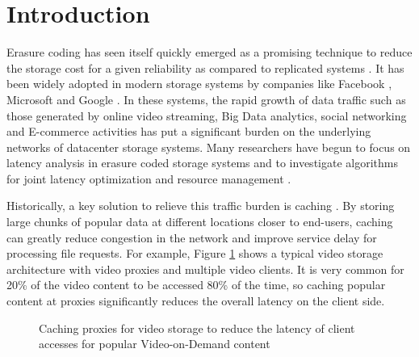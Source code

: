 \section{Introduction}

Erasure coding has seen itself quickly emerged as a promising technique to reduce the storage cost for a given reliability as compared to replicated systems \cite{2015_1,Dimakis:10}. It has been widely adopted in modern storage systems by companies like Facebook \cite{Sathiamoorthy13}, Microsoft \cite{Asure14} and Google \cite{Fikes10}. In these systems, the rapid growth of data traffic such as those generated by online video streaming, Big Data analytics, social networking and E-commerce activities has put a significant burden on the underlying networks of datacenter storage systems. Many researchers have begun to focus on latency analysis in erasure coded storage systems \cite{ISIT:12,Joshi:13,CS14,MDS-Queue,Xiang:2014:Sigmetrics:2014,Yu_TON} and to investigate algorithms for joint latency optimization and resource management \cite{Yu_TON,Yu-ICDCS,Yu-CCGRID}.

Historically, a key solution to relieve this traffic burden is caching \cite{td_cache}. By storing large chunks of popular data at different locations closer to end-users, caching can greatly reduce congestion in the network and improve service delay for processing file requests.   For example, Figure \ref{fig:proxy} shows a typical video storage architecture with video proxies and multiple video clients.  It is very common for 20\% of the video content to be accessed 80\% of the time, so caching popular content at proxies significantly reduces the overall latency on the client side.


\begin{figure}[!thbp]
\vspace{-2mm}
\begin{center}
\vspace{-3mm}
\caption{Caching proxies for video storage to reduce the latency of client accesses for popular Video-on-Demand content }
\label{fig:proxy}
\end{center}
\vspace{-.25in}
\end{figure}


